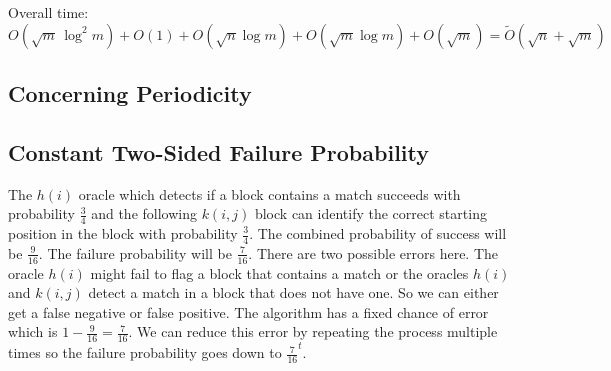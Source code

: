 \documentclass[12pt]{IEEEtran}
\begin{document}
Overall time: \(O(\sqrt{m}\,\log^2 m) + O(1) + O(\sqrt{n} \log m) + O(\sqrt{m} \log m) + O(\sqrt{m}) = \widetilde{O}(\sqrt{n} + \sqrt{m})\)

\subsection{Concerning Periodicity}

\subsection{Constant Two-Sided Failure Probability}
The \(h(i)\) oracle which detects if a block contains a match succeeds with probability \(\frac{3}{4}\) and the following \(k(i,j)\) block can identify the correct starting position in the block with probability \(\frac{3}{4}\). The combined probability of success will be \(\frac{9}{16}\). The failure probability will be \(\frac{7}{16}\). There are two possible errors here. The oracle \(h(i)\) might fail to flag a block that contains a match or
the oracles \(h(i)\) and \(k(i,j)\) detect a match in a block that does not have one. So we can either get a false negative or false positive. The algorithm has a fixed chance of error which is \(1-\frac{9}{16} = \frac{7}{16}\). We can reduce this error by repeating the process multiple times so the failure probability goes down to \(\frac{7}{16}^t\).



\end{document}
